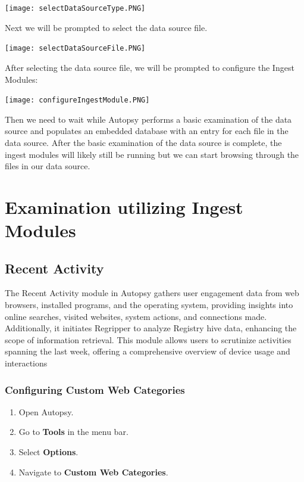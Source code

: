 \documentclass{article}
\begin{document}
\begin{center}
    \texttt{[image: selectDataSourceType.PNG]}
\end{center}

Next we will be prompted to select the data source file. 

\begin{center}
    \texttt{[image: selectDataSourceFile.PNG]}
\end{center}

After selecting the data source file, we will be prompted to configure the Ingest Modules:

\begin{center}
    \texttt{[image: configureIngestModule.PNG]}
\end{center}

Then we need to wait while Autopsy performs a basic examination of the data source and populates an embedded database with an entry for each file in the data source.
After the basic examination of the data source is complete, the ingest modules will likely still be running but we can start browsing through the files in our data source.

\section{Examination utilizing Ingest Modules}

\subsection{Recent Activity}
The Recent Activity module in Autopsy gathers user engagement data from web browsers, installed programs, and the operating system, providing insights into online searches, visited websites, system actions, and connections made. Additionally, it initiates Regripper to analyze Registry hive data, enhancing the scope of information retrieval. This module allows users to scrutinize activities spanning the last week, offering a comprehensive overview of device usage and interactions

\subsubsection*{Configuring Custom Web Categories}
\begin{enumerate}
  \item Open Autopsy.
  \item Go to \textbf{Tools} in the menu bar.
  \item Select \textbf{Options}.
  \item Navigate to \textbf{Custom Web Categories}.
\end{enumerate}
\end{document}
